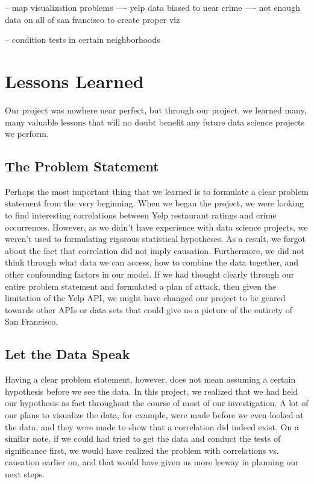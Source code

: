 \documentclass{article}
\begin{document}
-- map visualization problems
---- yelp data biased to near crime
---- not enough data on all of san francisco to create proper viz

-- condition tests in certain neighborhoods

\section{Lessons Learned}
\label{sec:lessons-learned}

Our project was nowhere near perfect, but through our project, we learned
many, many valuable lessons that will no doubt benefit any future data
science projects we perform.

\subsection{The Problem Statement}

Perhaps the most important thing that we learned is to formulate a clear
problem statement from the very beginning. When we began the project, we
were looking to find interesting correlations between Yelp restaurant
ratings and crime occurrences. However, as we didn't have experience with
data science projects, we weren't used to formulating rigorous statistical
hypotheses. As a result, we forgot about the fact that correlation did not
imply causation. Furthermore, we did not think through what data we can
access, how to combine the data together, and other confounding factors in
our model. If we had thought clearly through our entire problem statement
and formulated a plan of attack, then given the limitation of the Yelp API,
we might have changed our project to be geared towards other APIs or data
sets that could give us a picture of the entirety of San Francisco.

\subsection{Let the Data Speak}

Having a clear problem statement, however, does not mean assuming a certain
hypothesis before we see the data. In this project, we realized that we had
held our hypothesis as fact throughout the course of most of our
investigation. A lot of our plans to visualize the data, for example, were
made before we even looked at the data, and they were made to show that a
correlation did indeed exist. On a similar note, if we could had tried to
get the data and conduct the tests of significance first, we would have
realized the problem with correlations vs. causation earlier on, and that
would have given us more leeway in planning our next steps.
\end{document}
